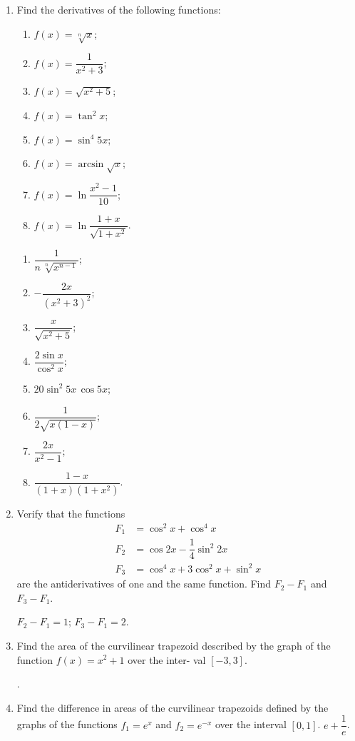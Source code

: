 \begin{enumerate}[label=\textcolor{IndianRed}{Problem \arabic*},leftmargin=2cm]
\item Find the derivatives of the following functions:
\begin{enumerate}[label=(\alph*)]
 \item $f(x) = \sqrt[n]{x}$;
 \item $f(x) = \dfrac{1}{x^{2} + 3}$;
 \item $f(x) = \sqrt{x^{2} + 5}$;
 \item $f(x) = \tan^{2} x$;
 \item $f(x) = \sin^{4} 5x $;
 \item $f(x) = \arcsin \sqrt{x}$;
 \item $f(x) = \ln \dfrac{x^{2} -1 }{10}$;
 \item $f(x) = \ln \dfrac{1 + x}{\sqrt{1 + x^{2}}}$.
 \end{enumerate}

\Answer \begin{enumerate}[label=(\alph*)]
 \item $ \dfrac{1}{n \, \sqrt[n]{x^{n -1}}}$;
 \item $- \dfrac{2x}{(x^{2} + 3)^{2}}$;
 \item $\dfrac{x}{\sqrt{x^{2}+5}}$;
 \item $\dfrac{2 \sin x}{\cos^{2} x}$;
 \item $20 \sin^{2} 5x \, \cos 5x$;
 \item $\dfrac{1}{2 \sqrt{x(1 -x)}}$;
 \item $\dfrac{2x}{x^{2} -1 }$;
 \item $\dfrac{1 - x}{(1 + x)(1 + x^{2})}$.
 \end{enumerate}

\item Verify that the functions 
\begin{align*}%
F_{1} & = \cos^{2} x + \cos^{4} x \\ 
F_{2} & = \cos 2x - \dfrac{1}{4} \sin^{2} 2x \\
F_{3} & = \cos^{4} x + 3 \cos^{2} x + \sin^{2} x 
\end{align*}
are the antiderivatives of one and the same function. Find $F_{2} - F_{1}$ and $F_{3} - F_{1}$. 

\Answer $F_{2} - F_{1} = 1$;  $F_{3} - F_{1} = 2$.

\item Find the area of the curvilinear trapezoid described by the graph of the function $f (x) = x^{2} + 1$ over the inter- val $[-3, 3]$. 

.

\item Find the difference in areas of the curvilinear trapezoids defined by the graphs of the functions $f_{1} = e^{x}$ and $f_{2} = e^{-x}$ over the interval $[0, 1]$.
\Answer $ e +  \dfrac{1}{e}$.


\end{enumerate}

